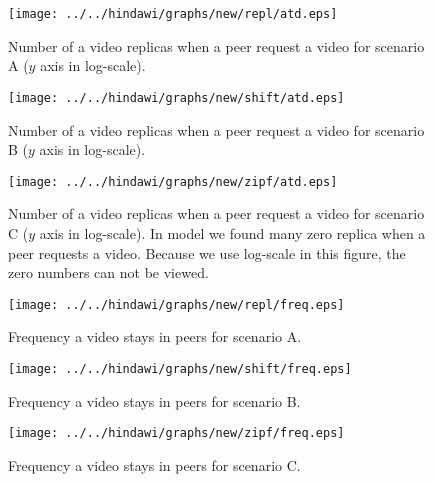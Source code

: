 \begin{figure}[!t]
\begin{center}
\texttt{[image: ../../hindawi/graphs/new/repl/atd.eps]}
\end{center}
\caption{Number of a video replicas when a peer request a video for scenario A ($y$ axis in log-scale).}
\label{fig:atd-normal}
\end{figure}

\begin{figure}[!t]
\begin{center}
\texttt{[image: ../../hindawi/graphs/new/shift/atd.eps]}
\end{center}
\caption{Number of a video replicas when a peer request a video for scenario B ($y$ axis in log-scale).}
\label{fig:atd-shift}
\end{figure}

\begin{figure}[!t]
\begin{center}
\texttt{[image: ../../hindawi/graphs/new/zipf/atd.eps]}
\end{center}
\caption{Number of a video replicas when a peer request a video for scenario C ($y$ axis in log-scale). In model we found many zero replica when a peer requests a video. Because we use log-scale in this figure, the zero numbers can not be viewed. }
\label{fig:atd-zipf}
\end{figure}



\begin{figure}[!t]
\begin{center}
\texttt{[image: ../../hindawi/graphs/new/repl/freq.eps]}
\end{center}
\caption{Frequency a video stays in peers for scenario A.}
\label{fig:freq-normal}
\end{figure}


\begin{figure}[!t]
\begin{center}
\texttt{[image: ../../hindawi/graphs/new/shift/freq.eps]}
\end{center}
\caption{Frequency a video stays in peers for scenario B.}
\label{fig:freq-shift}
\end{figure}


\begin{figure}[!t]
\begin{center}
\texttt{[image: ../../hindawi/graphs/new/zipf/freq.eps]}
\end{center}
\caption{Frequency a video stays in peers for scenario C.}
\label{fig:freq-zipf}
\end{figure}




